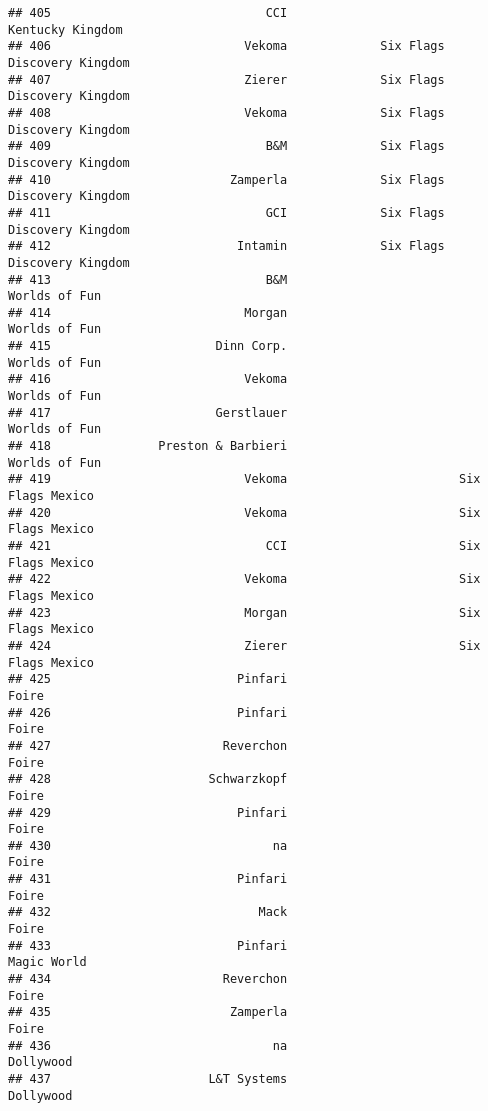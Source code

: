 \documentclass[
]{article}
\begin{document}
\begin{verbatim}
## 405                              CCI                        Kentucky Kingdom
## 406                           Vekoma             Six Flags Discovery Kingdom
## 407                           Zierer             Six Flags Discovery Kingdom
## 408                           Vekoma             Six Flags Discovery Kingdom
## 409                              B&M             Six Flags Discovery Kingdom
## 410                         Zamperla             Six Flags Discovery Kingdom
## 411                              GCI             Six Flags Discovery Kingdom
## 412                          Intamin             Six Flags Discovery Kingdom
## 413                              B&M                           Worlds of Fun
## 414                           Morgan                           Worlds of Fun
## 415                       Dinn Corp.                           Worlds of Fun
## 416                           Vekoma                           Worlds of Fun
## 417                       Gerstlauer                           Worlds of Fun
## 418               Preston & Barbieri                           Worlds of Fun
## 419                           Vekoma                        Six Flags Mexico
## 420                           Vekoma                        Six Flags Mexico
## 421                              CCI                        Six Flags Mexico
## 422                           Vekoma                        Six Flags Mexico
## 423                           Morgan                        Six Flags Mexico
## 424                           Zierer                        Six Flags Mexico
## 425                          Pinfari                                   Foire
## 426                          Pinfari                                   Foire
## 427                        Reverchon                                   Foire
## 428                      Schwarzkopf                                   Foire
## 429                          Pinfari                                   Foire
## 430                               na                                   Foire
## 431                          Pinfari                                   Foire
## 432                             Mack                                   Foire
## 433                          Pinfari                             Magic World
## 434                        Reverchon                                   Foire
## 435                         Zamperla                                   Foire
## 436                               na                               Dollywood
## 437                      L&T Systems                               Dollywood

\end{verbatim}
\end{document}

